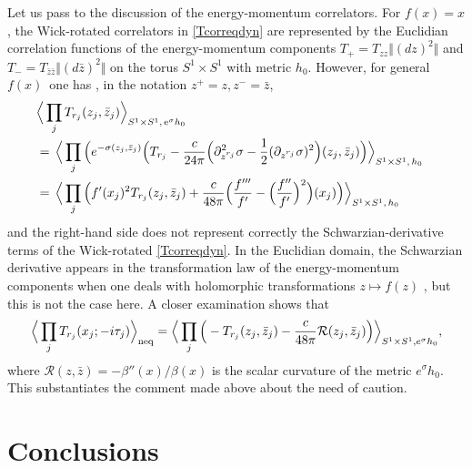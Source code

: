\documentclass[12pt,a4paper]{article}
\def\nsection#1{\section{#1}\setcounter{equation}{0}}
\newcommand{\ee}{{\rm e}}
\theoremstyle{definition}
\theoremstyle{remark}
\begin{document}
Let us pass to the discussion of the energy-momentum correlators.
For $f(x)=x$, the Wick-rotated correlators in \eqref{Tcorreqdyn} are
represented by the Euclidian correlation functions of the energy-momentum
components $T_+=T_{zz}\Vert(dz)^2\Vert$ and
$T_-=T_{\bar z\bar z}\Vert(d\bar z)^2\Vert$ on the torus $S^1\times S^1$
with metric $h_0$. However, for general
$f(x)$ \,one has \cite{KG}, in the notation $z^+=z,z^-=\bar z$,  
\begin{align}
&\Big\langle\prod_jT_{r_j}(z_j,\bar z_j)\Big\rangle_{S^1\times S^1,\,\ee^\sigma h_0}\cr
&=\,\Big\langle
\prod_j\Big(e^{-\sigma(z_j,\bar z_j)}
\Big(T_{r_j}-\frac{c}{24\pi}\Big(\partial_{z^{r_j}}^2\sigma
-\frac{1}{2}(\partial_{z^{r_j}}\sigma)^2\Big)(z_j,\bar z_j)\Big)
\Big\rangle_{S^1\times S^1,\,h_0}\cr
&=\,\Big\langle
\prod_j\Big(f'(x_j)^2T_{r_j}(z_j,\bar z_j)+\frac{c}{48\pi}\Big(\frac{f'''}
{f'}-\Big(\frac{f''}{f'}\Big)^2\Big)
(x_j)\Big)\Big\rangle_{S^1\times S^1,\,h_0}
\end{align}
and the right-hand side does not represent correctly the Schwarzian-derivative
terms of the Wick-rotated \eqref{Tcorreqdyn}. In the Euclidian domain,
the Schwarzian derivative appears in the transformation law of the
energy-momentum components when one deals with holomorphic transformations
$z\mapsto f(z)$ \cite{FMS,KG}, but this is not the case here.
A closer examination shows that
%
\begin{equation}
\Big\langle\prod\limits_jT_{r_j}(x_j;-i\tau_j)
\Big\rangle_{\rm neq}
=\Big\langle\prod\limits_j\Big(-T_{r_j}(z_j,\bar z_j) - \frac{c}{48\pi}{\mathcal R}(z_j,\bar z_j)\Big) \Big\rangle_{S^1\times S^1,e^\sigma h_0},
\end{equation}
%
where ${\mathcal R}(z,\bar z)=-\beta''(x)/\beta(x)$ is the scalar curvature of the metric $e^\sigma h_0$.
This substantiates the comment made above about the need of caution.


\nsection{Conclusions}
\label{sec:6}

\end{document}
